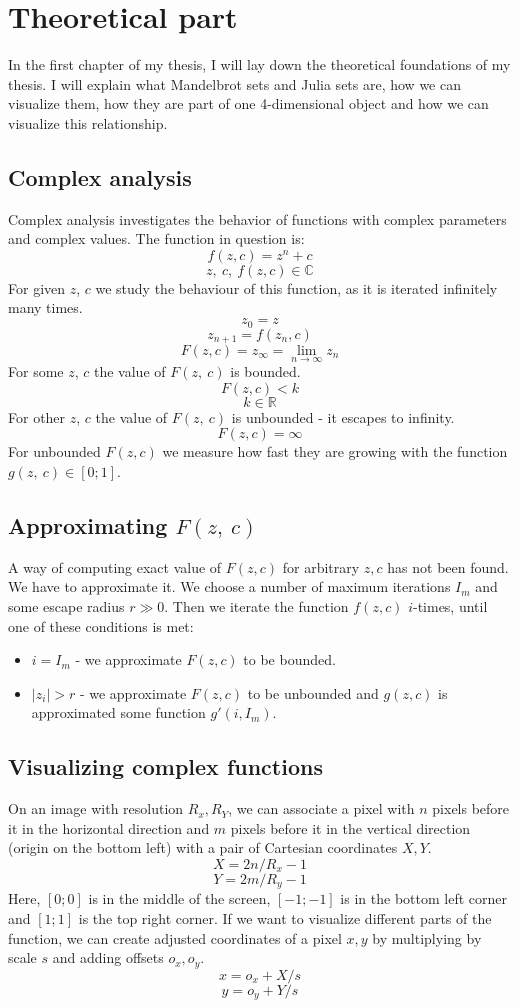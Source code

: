\documentclass[11pt,a4paper,twoside,openright]{report}
\begin{document}


\setcounter{tocdepth}{2}
\tableofcontents

\chapter{Theoretical part}
\pagestyle{fancy}
In the first chapter of my thesis, I will lay down the theoretical foundations of my thesis. I will explain what Mandelbrot sets and Julia sets are, how we can visualize them, how they are part of one 4-dimensional object and how we can visualize this relationship. 

\section{Complex analysis}
Complex analysis investigates the behavior of functions with complex parameters and complex values. The function in question is:
\[f(z, c) = z^n + c\]
\[z,\ c,\ f(z,c) \in \mathbb{C}\]
For given $z$, $c$ we study the behaviour of this function, as it is iterated infinitely many times.
\[z_{0} = z\]
\[z_{n+1} = f(z_n, c)\]
\[F(z, c) = z_{\infty} = \lim_{n\to\infty} z_n\]
For some $z$, $c$ the value of $F(z,\:c)$ is bounded.
\[F(z,c) < k \]
\[ k \in \mathbb{R}\]
For other $z$, $c$ the value of $F(z,\:c)$ is unbounded - it escapes to infinity.
\[F(z,c)     = \infty \]
For unbounded $F(z,c)$ we measure how fast they are growing with the function $g(z,\:c) \in [0;1]$. \cite{complex_analysis}
\section{Approximating $F(z,\:c)$}
A way of computing exact value of $F(z, c)$ for arbitrary $z,c$ has not been found. We have to approximate it. We choose a number of maximum iterations $I_m$ and some escape radius $r\gg0$. Then we iterate the function $f(z,c)$ $i$-times, until one of these conditions is met:
\begin{itemize}
    \item $i = I_m$ - we approximate $F(z,c)$ to be bounded.
    \item $|z_i| > r$ - we approximate $F(z,c)$ to be unbounded and $g(z, c)$ is approximated some function $g'(i, I_m)$.
\end{itemize}

\section{Visualizing complex functions}
On an image with resolution $R_x, R_Y$, we can associate a pixel with $n$ pixels before it in the horizontal direction and $m$ pixels before it in the vertical direction (origin on the bottom left) with a pair of Cartesian coordinates $X, Y$.
\[X = 2n/R_x - 1\]
\[Y = 2m/R_y - 1\]
Here, $[0;0]$ is in the middle of the screen, $[-1;-1]$ is in the bottom left corner and $[1;1]$ is the top right corner. If we want to visualize different parts of the function, we can create adjusted coordinates of a pixel $x,y$ by multiplying by scale $s$ and  adding offsets $o_x, o_y$. 
\[x = o_x + X/s\]
\[y = o_y + Y/s\]
\end{document}

